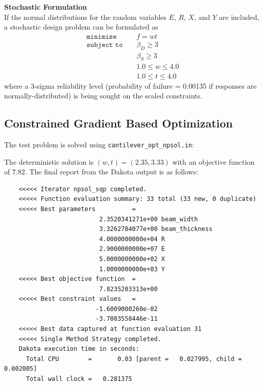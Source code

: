 {\bf Stochastic Formulation } \\
If the normal distributions for the random variables $E$, $R$, $X$,
and $Y$ are included, a stochastic design problem can be formulated as
\begin{eqnarray}
\texttt{minimize }   & & f = w t            \nonumber\\
\texttt{subject to } & & \beta_{D} \geq 3   \label{additional:cantouu}\\
                     & & \beta_{S} \geq 3   \nonumber\\
                     & & 1.0 \leq w \leq 4.0\nonumber\\
                     & & 1.0 \leq t \leq 4.0\nonumber
\end{eqnarray}
where a 3-sigma reliability level (probability of failure = 0.00135 if
responses are normally-distributed) is being sought on the scaled
constraints.

\subsection{Constrained Gradient Based Optimization}
The test problem is solved using {\tt cantilever\_opt\_npsol.in}:
\begin{center}
  \begin{small}
    \begin{bigbox}
    \end{bigbox}
  \end{small}
\end{center}

The deterministic solution is $(w,t)=(2.35,3.33)$ with an objective
function of $7.82$. The final report from the Dakota output is as
follows:
\begin{small}
\begin{verbatim}
    <<<<< Iterator npsol_sqp completed.
    <<<<< Function evaluation summary: 33 total (33 new, 0 duplicate)
    <<<<< Best parameters          =
                          2.3520341271e+00 beam_width
                          3.3262784077e+00 beam_thickness
                          4.0000000000e+04 R
                          2.9000000000e+07 E
                          5.0000000000e+02 X
                          1.0000000000e+03 Y
    <<<<< Best objective function  =
                          7.8235203313e+00
    <<<<< Best constraint values   =
                         -1.6009000260e-02
                         -3.7083558446e-11
    <<<<< Best data captured at function evaluation 31
    <<<<< Single Method Strategy completed.
    Dakota execution time in seconds:
      Total CPU        =       0.03 [parent =   0.027995, child =   0.002005]
      Total wall clock =   0.281375
\end{verbatim}
\end{small}

